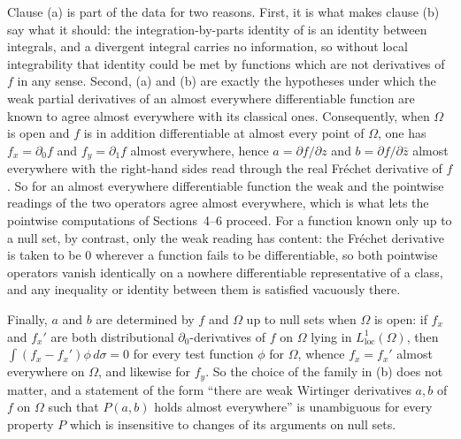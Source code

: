 \begin{definition}
Clause (a) is part of the data for two reasons.  First, it is what makes
clause (b) say what it should: the integration-by-parts identity of
 is an identity between integrals, and a divergent
integral carries no information, so without local integrability that identity
could be met by functions which are not derivatives of $f$ in any sense.
Second, (a) and (b) are exactly the hypotheses under which the weak partial
derivatives of an almost everywhere differentiable function are known to agree
almost everywhere with its classical ones.  Consequently, when $\Omega$ is
open and $f$ is in addition differentiable at almost every point of $\Omega$,
one has $f_x=\partial_0f$ and $f_y=\partial_1f$ almost everywhere, hence
$a=\partial f/\partial z$ and $b=\partial f/\partial\bar z$ almost everywhere
with the right-hand sides read through the real Fr\'echet derivative of $f$.
So for an almost everywhere differentiable function the weak and the pointwise
readings of the two operators agree almost everywhere, which is what lets the
pointwise computations of Sections~4--6 proceed.  For a function known only up
to a null set, by contrast, only the weak reading has content: the Fr\'echet
derivative is taken to be $0$ wherever a function fails to be differentiable,
so both pointwise operators vanish identically on a nowhere differentiable
representative of a class, and any inequality or identity between them is
satisfied vacuously there.

Finally, $a$ and $b$ are determined by $f$ and $\Omega$ up to null sets when
$\Omega$ is open: if $f_x$ and $f_x'$ are both distributional
$\partial_0$-derivatives of $f$ on $\Omega$ lying in
$L^1_{\mathrm{loc}}(\Omega)$, then $\int(f_x-f_x')\phi\,d\sigma=0$ for every
test function $\phi$ for $\Omega$, whence $f_x=f_x'$ almost everywhere on
$\Omega$, and likewise for $f_y$.  So the choice of the family in (b) does not
matter, and a statement of the form ``there are weak Wirtinger derivatives
$a,b$ of $f$ on $\Omega$ such that $P(a,b)$ holds almost everywhere'' is
unambiguous for every property $P$ which is insensitive to changes of its
arguments on null sets.
\end{definition}

